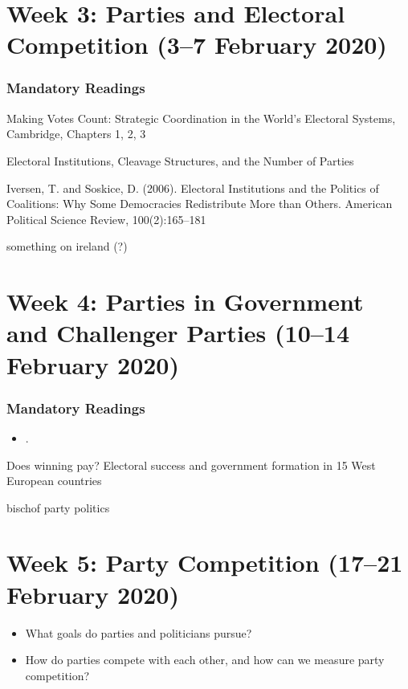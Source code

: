 \documentclass[abstract=on,parskip=full,headings=standardclasses,fontsize=11pt,paper=a4]{scrartcl}
\begin{document}
\section{Week 3: Parties and Electoral Competition (3--7 February 2020)}

\subsubsection*{Mandatory Readings}

Making Votes Count: Strategic Coordination in the World's Electoral Systems, Cambridge, Chapters 1, 2, 3


Electoral Institutions, Cleavage Structures, and the Number of Parties


Iversen, T. and Soskice, D. (2006). Electoral Institutions and the Politics of Coalitions: Why Some Democracies Redistribute More than Others. American Political Science Review, 100(2):165–181

something on ireland (?)


\section{Week 4: Parties in Government and Challenger Parties (10--14 February 2020)}


\subsubsection*{Mandatory Readings}
\begin{itemize}
\item {}.
\end{itemize}



Does winning pay? Electoral success and government formation in 15 West European countries

bischof party politics


\section{Week 5:  Party Competition (17--21 February 2020)}

\begin{itemize}
\renewcommand\labelitemi{--}
\item What goals do parties and politicians pursue?
\item How do parties compete with each other, and how can we measure party competition?
\end{itemize}
\end{document}
